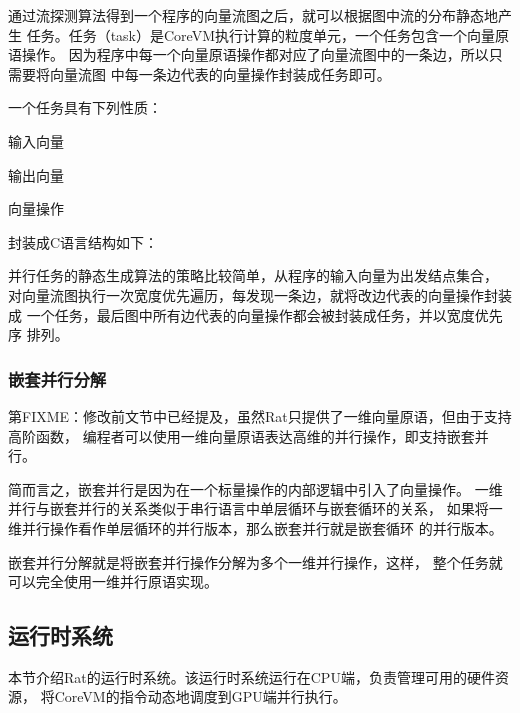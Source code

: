通过流探测算法得到一个程序的向量流图之后，就可以根据图中流的分布静态地产生
任务。任务（task）是CoreVM执行计算的粒度单元，一个任务包含一个向量原语操作。
因为程序中每一个向量原语操作都对应了向量流图中的一条边，所以只需要将向量流图
中每一条边代表的向量操作封装成任务即可。

一个任务具有下列性质：
\begin{compactitem}
  \item 输入向量
  \item 输出向量
  \item 向量操作
\end{compactitem}

封装成C语言结构如下：


并行任务的静态生成算法的策略比较简单，从程序的输入向量为出发结点集合，
对向量流图执行一次宽度优先遍历，每发现一条边，就将改边代表的向量操作封装成
一个任务，最后图中所有边代表的向量操作都会被封装成任务，并以宽度优先序
排列。

\subsubsection{嵌套并行分解}
第FIXME：修改前文节中已经提及，虽然Rat只提供了一维向量原语，但由于支持高阶函数，
编程者可以使用一维向量原语表达高维的并行操作，即支持嵌套并行。

简而言之，嵌套并行是因为在一个标量操作的内部逻辑中引入了向量操作。
一维并行与嵌套并行的关系类似于串行语言中单层循环与嵌套循环的关系，
如果将一维并行操作看作单层循环的并行版本，那么嵌套并行就是嵌套循环
的并行版本。
\begin{quotation}
\end{quotation}

嵌套并行分解就是将嵌套并行操作分解为多个一维并行操作，这样，
整个任务就可以完全使用一维并行原语实现。

\subsection{运行时系统}\label{subsec:runtime-system}
本节介绍Rat的运行时系统。该运行时系统运行在CPU端，负责管理可用的硬件资源，
将CoreVM的指令动态地调度到GPU端并行执行。

